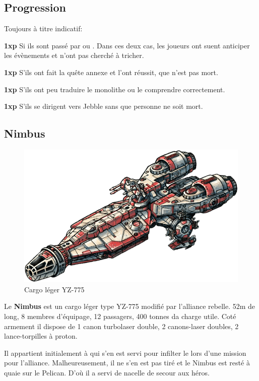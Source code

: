 \subsection{Progression}
Toujours à titre indicatif:
\begin{rebelist}
    \item \textbf{1xp} Si ils sont passé par  ou . Dans ces deux cas, les joueurs ont suent anticiper les évènements et n'ont pas cherché à tricher.
    \item \textbf{1xp} S'ils ont fait la quête annexe et l'ont réussit, que  n'est pas mort.
    \item \textbf{1xp} S'ils ont peu traduire le monolithe ou le comprendre correctement.
    \item \textbf{1xp} S'ils se dirigent vers Jebble sans que personne ne soit mort.
\end{rebelist}

\newpage
\subsection{Nimbus} \label{sec:nimbus}
\vspace{-4\baselineskip}
\begin{figure}[h!]
    \centering
    \includegraphics[width=\linewidth]{_img/dos-au-muur/nimbus.png}
    \caption{Cargo léger YZ-775}
\end{figure}

Le \textbf{Nimbus} est un cargo léger type YZ-775 modifié par l'alliance rebelle. 52m de long, 8 membres d'équipage, 12 passagers, 400 tonnes da charge utile. Coté armement il dispose de 1 canon turbolaser double, 2 canons-laser doubles, 2 lance-torpilles à proton.

Il appartient initialement à  qui s'en est servi pour infilter le  lors d'une mission pour l'alliance. Malheureusement, il ne s'en est pas tiré et le Nimbus est resté à quaie sur le Pelican. D'où il a servi de nacelle de secour aux héros.
